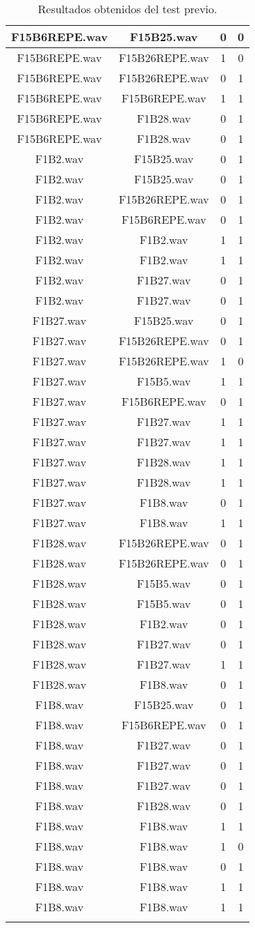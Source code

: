 \documentclass[11pt,a4paper,twoside]{book}
\begin{document}
\begin{longtable}[c]{|c|c|c|c|}
F15B6REPE.wav&F15B25.wav&0&0\\ \hline
F15B6REPE.wav&F15B26REPE.wav&1&0\\ \hline
F15B6REPE.wav&F15B26REPE.wav&0&1\\ \hline
F15B6REPE.wav&F15B6REPE.wav&1&1\\ \hline
F15B6REPE.wav&F1B28.wav&0&1\\ \hline
F15B6REPE.wav&F1B28.wav&0&1\\ \hline
F1B2.wav&F15B25.wav&0&1\\ \hline
F1B2.wav&F15B25.wav&0&1\\ \hline
F1B2.wav&F15B26REPE.wav&0&1\\ \hline
F1B2.wav&F15B6REPE.wav&0&1\\ \hline
F1B2.wav&F1B2.wav&1&1\\ \hline
F1B2.wav&F1B2.wav&1&1\\ \hline
F1B2.wav&F1B27.wav&0&1\\ \hline
F1B2.wav&F1B27.wav&0&1\\ \hline
F1B27.wav&F15B25.wav&0&1\\ \hline
F1B27.wav&F15B26REPE.wav&0&1\\ \hline
F1B27.wav&F15B26REPE.wav&1&0\\ \hline
F1B27.wav&F15B5.wav&1&1\\ \hline
F1B27.wav&F15B6REPE.wav&0&1\\ \hline
F1B27.wav&F1B27.wav&1&1\\ \hline
F1B27.wav&F1B27.wav&1&1\\ \hline
F1B27.wav&F1B28.wav&1&1\\ \hline
F1B27.wav&F1B28.wav&1&1\\ \hline
F1B27.wav&F1B8.wav&0&1\\ \hline
F1B27.wav&F1B8.wav&1&1\\ \hline
F1B28.wav&F15B26REPE.wav&0&1\\ \hline
F1B28.wav&F15B26REPE.wav&0&1\\ \hline
F1B28.wav&F15B5.wav&0&1\\ \hline
F1B28.wav&F15B5.wav&0&1\\ \hline
F1B28.wav&F1B2.wav&0&1\\ \hline
F1B28.wav&F1B27.wav&0&1\\ \hline
F1B28.wav&F1B27.wav&1&1\\ \hline
F1B28.wav&F1B8.wav&0&1\\ \hline
F1B8.wav&F15B25.wav&0&1\\ \hline
F1B8.wav&F15B6REPE.wav&0&1\\ \hline
F1B8.wav&F1B27.wav&0&1\\ \hline
F1B8.wav&F1B27.wav&0&1\\ \hline
F1B8.wav&F1B27.wav&0&1\\ \hline
F1B8.wav&F1B28.wav&0&1\\ \hline
F1B8.wav&F1B8.wav&1&1\\ \hline
F1B8.wav&F1B8.wav&1&0\\ \hline
F1B8.wav&F1B8.wav&0&1\\ \hline
F1B8.wav&F1B8.wav&1&1\\ \hline
F1B8.wav&F1B8.wav&1&1\\ \hline
\caption{Resultados obtenidos del test previo.} 
\end{longtable}
\end{document}

